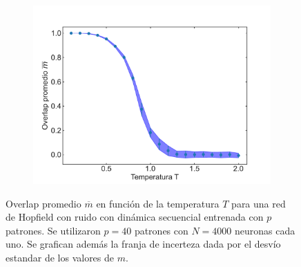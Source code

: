 \documentclass[11pt,twocolumn,twoside]{opticajnl}
\begin{document}
\begin{figure}[H]
    \centering
    \begin{subfigure}[h]{\linewidth}
        \includegraphics[width=\textwidth]{Figuras/m_vs_T.pdf}
     \end{subfigure}
    \caption{Overlap promedio $\overline{m}$ en función de la temperatura $T$ para una red de Hopfield con ruido con dinámica secuencial entrenada con $p$ patrones. Se utilizaron $p=40$ patrones con $N=4000$ neuronas cada uno. Se grafican además la franja de incerteza dada por el desvío estandar de los valores de $m$.} 
    \label{fig:m_vs_T}
\end{figure}








%


\clearpage
\end{document}
